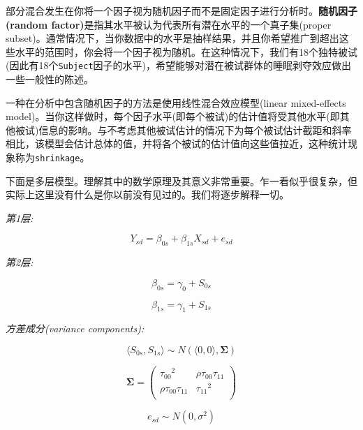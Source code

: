 \documentclass[
]{book}
\begin{document}
部分混合发生在你将一个因子视为随机因子而不是固定因子进行分析时。\textbf{随机因子(random factor)}是指其水平被认为代表所有潜在水平的一个真子集(proper subset)。通常情况下，当你数据中的水平是抽样结果，并且你希望推广到超出这些水平的范围时，你会将一个因子视为随机。在这种情况下，我们有18个独特被试(因此有18个\texttt{Subject}因子的水平)，希望能够对潜在被试群体的睡眠剥夺效应做出一些一般性的陈述。

一种在分析中包含随机因子的方法是使用线性混合效应模型(linear mixed-effects model)。当你这样做时，每个因子水平(即每个被试)的估计值将受其他水平(即其他被试)信息的影响。与不考虑其他被试估计的情况下为每个被试估计截距和斜率相比，该模型会估计总体的值，并将各个被试的估计值向这些值拉近，这种统计现象称为\texttt{shrinkage}。

下面是多层模型。理解其中的数学原理及其意义非常重要。乍一看似乎很复杂，但实际上这里没有什么是你以前没有见过的。我们将逐步解释一切。

\emph{第1层:}

\begin{equation}
Y_{sd} = \beta_{0s} + \beta_{1s} X_{sd} + e_{sd}
\end{equation}

\emph{第2层:}

\begin{equation}
\beta_{0s} = \gamma_{0} + S_{0s}
\end{equation}

\begin{equation}
\beta_{1s} = \gamma_{1} + S_{1s}
\end{equation}

\emph{方差成分(variance components):}

\begin{equation}
 \langle S_{0s}, S_{1s} \rangle \sim N\left(\langle 0, 0 \rangle, \mathbf{\Sigma}\right) 
\end{equation}

\begin{equation}
\mathbf{\Sigma} = \left(\begin{array}{cc}{\tau_{00}}^2 & \rho\tau_{00}\tau_{11} \\
         \rho\tau_{00}\tau_{11} & {\tau_{11}}^2 \\
         \end{array}\right) 
\end{equation}

\begin{equation}
e_{sd} \sim N\left(0, \sigma^2\right)
\end{equation}
\end{document}
